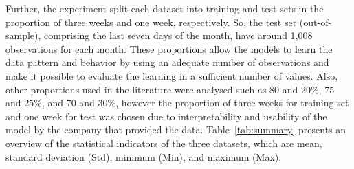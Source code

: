 Further, the experiment split each dataset into training and test sets in the proportion of three weeks and one week, respectively. So, the test set (out-of-sample), comprising the last seven days of the month, have around 1,008 observations for each month. These proportions allow the models to learn the data pattern and behavior by using an adequate number of observations and make it possible to evaluate the learning in a sufficient number of values. Also, other proportions used in the literature were analysed such as 80 and 20\%, 75 and 25\%, and 70 and 30\%, however the proportion of three weeks for training set and one week for test was chosen due to interpretability and usability of the model by the company that provided the data. Table~\ref{tab:summary} presents an overview of the statistical indicators of the three datasets, which are mean, standard deviation (Std), minimum (Min), and maximum (Max).

